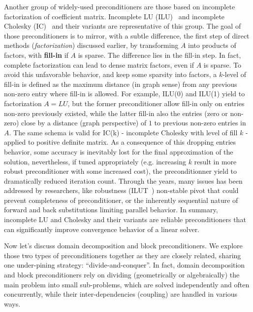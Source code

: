 Another group of widely-used preconditioners are those based on incomplete factorization of coefficient matrix. Incomplete LU (ILU)~\cite{chan_approximate_1997} and incomplete Cholesky (IC)~\cite{gustafsson_class_1978} and their variants are representative of this group. The goal of those preconditioners is to mirror, with a subtle difference, the first step of direct methods (\textit{factorization}) discussed earlier, by transforming $A$ into products of factors, with \textbf{fill-in} if $A$ is sparse. The difference lies in the fill-in step. In fact, complete factorization can lead to dense matrix factors, even if $A$ is sparse. To avoid this unfavorable behavior, and keep some sparsity into factors, a $k$-level of fill-in is defined as the maximum distance (in graph sense) from any previous non-zero entry where fill-in is allowed. For example, ILU(0) and ILU(1) yield to factorization $A=LU$, but the former preconditioner allow fill-in only on entries non-zero previously existed, while the latter fill-in also the entries (zero or non-zero) close by a distance (graph perspective) of $1$ to previous non-zero entries in $A$. The same schema is valid for IC(k) - incomplete Cholesky with level of fill $k$ - applied to positive definite matrix. As a consequence of this dropping entries behavior, some accuracy is inevitably lost for the final approximation of the solution, nevertheless, if tuned appropriately (e.g. increasing $k$ result in more robust preconditioner with some increased cost), the preconditionner yield to dramatically reduced iteration count. Through the years, many issues has been addressed by researchers, like robustness (ILUT~\cite{saad_ilut_1994}) non-stable pivot that could prevent completeness of preconditioner, or the inherently sequential nature of forward and back substitutions limiting parallel behavior. In summary, incomplete LU and Cholesky and their variants are reliable preconditioners that can significantly improve convergence behavior of a linear solver.

Now let's discuss domain decomposition and block preconditioners. We explore those two types of preconditioners together as they are closely related, sharing one under-pining strategy: ``divide-and-conquer''. In fact, domain decomposition and block preconditioners rely on dividing (geometrically or algebraically) the main problem into small sub-problems, which are solved independently and often concurrently, while their inter-dependencies (coupling) are handled in various ways.

